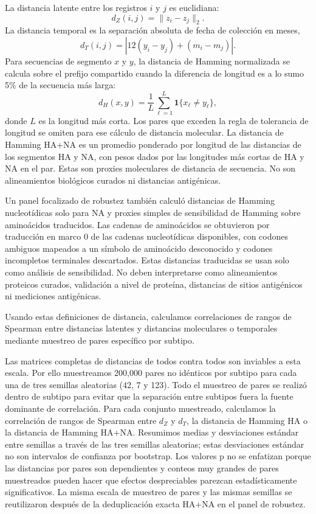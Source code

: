 \documentclass[11pt]{article}
\begin{document}
La distancia latente entre los registros $i$ y $j$ es euclidiana:
\[
d_Z(i,j)=\lVert z_i-z_j\rVert_2.
\]
La distancia temporal es la separación absoluta de fecha de colección en meses,
\[
d_T(i,j)=\left|12(y_i-y_j)+(m_i-m_j)\right|.
\]
Para secuencias de segmento $x$ y $y$, la distancia de Hamming normalizada se calcula sobre el prefijo compartido cuando la diferencia de longitud es a lo sumo 5\% de la secuencia más larga:
\[
d_H(x,y)=\frac{1}{L}\sum_{\ell=1}^{L}\mathbf{1}\{x_\ell\neq y_\ell\},
\]
donde $L$ es la longitud más corta. Los pares que exceden la regla de tolerancia de longitud se omiten para ese cálculo de distancia molecular. La distancia de Hamming HA+NA es un promedio ponderado por longitud de las distancias de los segmentos HA y NA, con pesos dados por las longitudes más cortas de HA y NA en el par. Estas son proxies moleculares de distancia de secuencia. No son alineamientos biológicos curados ni distancias antigénicas.

Un panel focalizado de robustez también calculó distancias de Hamming nucleotídicas solo para NA y proxies simples de sensibilidad de Hamming sobre aminoácidos traducidos. Las cadenas de aminoácidos se obtuvieron por traducción en marco 0 de las cadenas nucleotídicas disponibles, con codones ambiguos mapeados a un símbolo de aminoácido desconocido y codones incompletos terminales descartados. Estas distancias traducidas se usan solo como análisis de sensibilidad. No deben interpretarse como alineamientos proteicos curados, validación a nivel de proteína, distancias de sitios antigénicos ni mediciones antigénicas.

Usando estas definiciones de distancia, calculamos correlaciones de rangos de Spearman entre distancias latentes y distancias moleculares o temporales mediante muestreo de pares específico por subtipo.

Las matrices completas de distancias de todos contra todos son inviables a esta escala. Por ello muestreamos 200,000 pares no idénticos por subtipo para cada una de tres semillas aleatorias (42, 7 y 123). Todo el muestreo de pares se realizó dentro de subtipo para evitar que la separación entre subtipos fuera la fuente dominante de correlación. Para cada conjunto muestreado, calculamos la correlación de rangos de Spearman \cite{spearman1904} entre $d_Z$ y $d_T$, la distancia de Hamming HA o la distancia de Hamming HA+NA. Resumimos medias y desviaciones estándar entre semillas a través de las tres semillas aleatorias; estas desviaciones estándar no son intervalos de confianza por bootstrap. Los valores p no se enfatizan porque las distancias por pares son dependientes y conteos muy grandes de pares muestreados pueden hacer que efectos despreciables parezcan estadísticamente significativos. La misma escala de muestreo de pares y las mismas semillas se reutilizaron después de la deduplicación exacta HA+NA en el panel de robustez.
\end{document}
